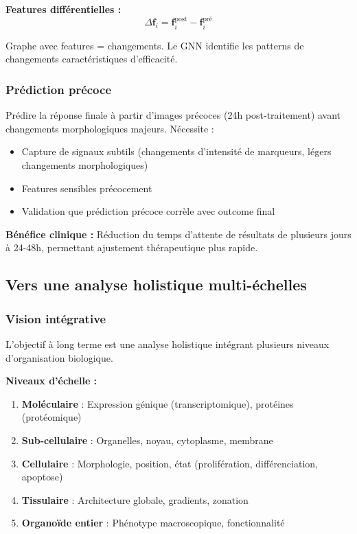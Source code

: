 \textbf{Features différentielles :}
\[
\Delta \mathbf{f}_i = \mathbf{f}_i^{\text{post}} - \mathbf{f}_i^{\text{pré}}
\]

Graphe avec features = changements. Le GNN identifie les patterns de changements caractéristiques d'efficacité.

\subsubsection{Prédiction précoce}

Prédire la réponse finale à partir d'images précoces (24h post-traitement) avant changements morphologiques majeurs. Nécessite :
\begin{itemize}
    \item Capture de signaux subtils (changements d'intensité de marqueurs, légers changements morphologiques)
    \item Features sensibles précocement
    \item Validation que prédiction précoce corrèle avec outcome final
\end{itemize}

\textbf{Bénéfice clinique :}
Réduction du temps d'attente de résultats de plusieurs jours à 24-48h, permettant ajustement thérapeutique plus rapide.

\subsection{Vers une analyse holistique multi-échelles}

\subsubsection{Vision intégrative}

L'objectif à long terme est une analyse holistique intégrant plusieurs niveaux d'organisation biologique.

\textbf{Niveaux d'échelle :}
\begin{enumerate}
    \item \textbf{Moléculaire} : Expression génique (transcriptomique), protéines (protéomique)
    \item \textbf{Sub-cellulaire} : Organelles, noyau, cytoplasme, membrane
    \item \textbf{Cellulaire} : Morphologie, position, état (prolifération, différenciation, apoptose)
    \item \textbf{Tissulaire} : Architecture globale, gradients, zonation
    \item \textbf{Organoïde entier} : Phénotype macroscopique, fonctionnalité
\end{enumerate}

